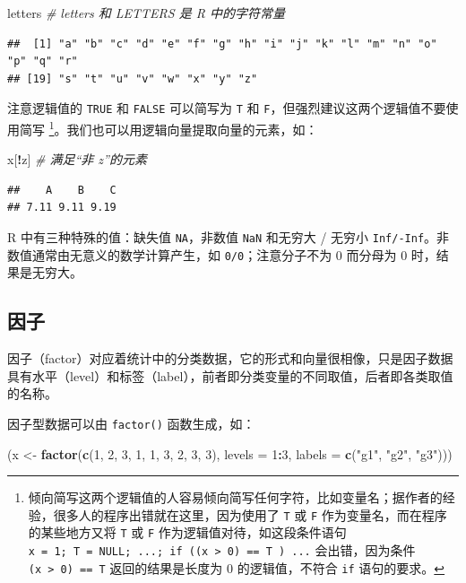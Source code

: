 \documentclass[
  b5paper,
  UTF8,twoside]{book}
\newenvironment{Shaded}{\begin{snugshade}}{\end{snugshade}}
\newcommand{\AttributeTok}[1]{\textcolor[rgb]{0.13,0.29,0.53}{#1}}
\newcommand{\CommentTok}[1]{\textcolor[rgb]{0.56,0.35,0.01}{\textit{#1}}}
\newcommand{\DecValTok}[1]{\textcolor[rgb]{0.00,0.00,0.81}{#1}}
\newcommand{\FunctionTok}[1]{\textcolor[rgb]{0.13,0.29,0.53}{\textbf{#1}}}
\newcommand{\NormalTok}[1]{#1}
\newcommand{\OtherTok}[1]{\textcolor[rgb]{0.56,0.35,0.01}{#1}}
\newcommand{\SpecialCharTok}[1]{\textcolor[rgb]{0.81,0.36,0.00}{\textbf{#1}}}
\newcommand{\StringTok}[1]{\textcolor[rgb]{0.31,0.60,0.02}{#1}}
\begin{document}
\begin{Shaded}
\begin{Highlighting}[]
\NormalTok{letters }\CommentTok{\# letters 和 LETTERS 是 R 中的字符常量}
\end{Highlighting}
\end{Shaded}

\begin{verbatim}
##  [1] "a" "b" "c" "d" "e" "f" "g" "h" "i" "j" "k" "l" "m" "n" "o" "p" "q" "r"
## [19] "s" "t" "u" "v" "w" "x" "y" "z"
\end{verbatim}

注意逻辑值的 \texttt{TRUE} 和 \texttt{FALSE} 可以简写为 \texttt{T} 和 \texttt{F}，但强烈建议这两个逻辑值不要使用简写 \footnote{倾向简写这两个逻辑值的人容易倾向简写任何字符，比如变量名；据作者的经验，很多人的程序出错就在这里，因为使用了 \texttt{T} 或 \texttt{F} 作为变量名，而在程序的某些地方又将 \texttt{T} 或 \texttt{F} 作为逻辑值对待，如这段条件语句 \texttt{x\ =\ 1;\ T\ =\ NULL;\ ...;\ if\ ((x\ \textgreater{}\ 0)\ ==\ T\ )\ ...} 会出错，因为条件 \texttt{(x\ \textgreater{}\ 0)\ ==\ T} 返回的结果是长度为 0 的逻辑值，不符合 \texttt{if} 语句的要求。}。我们也可以用逻辑向量提取向量的元素，如：

\begin{Shaded}
\begin{Highlighting}[]
\NormalTok{x[}\SpecialCharTok{!}\NormalTok{z] }\CommentTok{\# 满足“非 z”的元素}
\end{Highlighting}
\end{Shaded}

\begin{verbatim}
##    A    B    C 
## 7.11 9.11 9.19
\end{verbatim}

R 中有三种特殊的值：缺失值 \texttt{NA}，非数值 \texttt{NaN} 和无穷大 / 无穷小 \texttt{Inf/-Inf}。非数值通常由无意义的数学计算产生，如 \texttt{0/0}；注意分子不为 0 而分母为 0 时，结果是无穷大。

\subsection{因子}\label{ux56e0ux5b50}

因子（factor）对应着统计中的分类数据，它的形式和向量很相像，只是因子数据具有水平（level）和标签（label），前者即分类变量的不同取值，后者即各类取值的名称。

因子型数据可以由 \texttt{factor()} 函数生成，如：

\begin{Shaded}
\begin{Highlighting}[]
\NormalTok{(x }\OtherTok{\textless{}{-}} \FunctionTok{factor}\NormalTok{(}\FunctionTok{c}\NormalTok{(}\DecValTok{1}\NormalTok{, }\DecValTok{2}\NormalTok{, }\DecValTok{3}\NormalTok{, }\DecValTok{1}\NormalTok{, }\DecValTok{1}\NormalTok{, }\DecValTok{3}\NormalTok{, }\DecValTok{2}\NormalTok{, }\DecValTok{3}\NormalTok{, }\DecValTok{3}\NormalTok{), }\AttributeTok{levels =} \DecValTok{1}\SpecialCharTok{:}\DecValTok{3}\NormalTok{, }\AttributeTok{labels =} \FunctionTok{c}\NormalTok{(}\StringTok{"g1"}\NormalTok{, }\StringTok{"g2"}\NormalTok{, }\StringTok{"g3"}\NormalTok{)))}
\end{Highlighting}
\end{Shaded}
\end{document}
